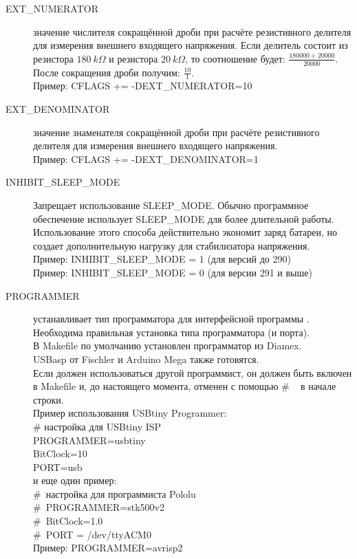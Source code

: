 \begin{description}
  \item[EXT\_NUMERATOR] значение числителя сокращённой дроби при расчёте резистивного делителя для измерения внешнего 
входящего напряжения.
Если делитель состоит из резистора \(180~k\Omega\) и резистора \(20~k\Omega\), то соотношение будет:
\(\frac{ 180000 + 20000}{ 20000}\).
После сокращения дроби получим: \(\frac{ 10}{ 1}\). \\
Пример: CFLAGS += -DEXT\_NUMERATOR=10

  \item[EXT\_DENOMINATOR] значение знаменателя сокращённой дроби при расчёте резистивного делителя для измерения 
внешнего входящего напряжения. \\
Пример: CFLAGS += -DEXT\_DENOMINATOR=1

  \item[INHIBIT\_SLEEP\_MODE] Запрещает использование SLEEP\_MODE. Обычно программное обеспечение 
использует SLEEP\_MODE для более длительной работы. Использование этого способа действительно экономит 
заряд батареи, но создает дополнительную нагрузку для стабилизатора напряжения.\\
Пример: INHIBIT\_SLEEP\_MODE = 1 (для версий до 290)\\
Пример: INHIBIT\_SLEEP\_MODE = 0 (для версии 291 и выше)
\label{sec:config-Prog}
  \item[PROGRAMMER] \label{PROGRAMMER}устанавливает тип программатора для интерфейсной программы .\\

Необходима правильная установка типа программатора (и порта). \\
В Makefile по умолчанию установлен программатор из Diamex. \\
USBasp от Fischler и Arduino Mega также готовятся. \\
Если должен использоваться другой программист, он должен быть включен в Makefile и, до настоящего момента, отменен с помощью \# ~ в начале строки. \\
Пример использования USBtiny Programmer: \\
\# настройка для USBtiny ISP\\
PROGRAMMER=usbtiny\\
BitClock=10\\
PORT=usb\\
и еще один пример:\\
\#~настройка для программиста Pololu\\
\#~PROGRAMMER=stk500v2\\
\#~BitClock=1.0\\
\#~PORT = /dev/ttyACM0\\
Пример: PROGRAMMER=avrisp2



\end{description}
